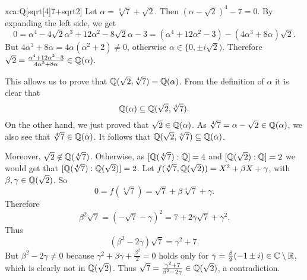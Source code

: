 \begin{sol}{xca:Q[sqrt[4]{7}+sqrt{2}]}
Let $\alpha=\sqrt[4]{7}+\sqrt{2}$. Then $(\alpha - \sqrt{2})^4 -7 = 0$.
By expanding the left side, we get
\[
0  =\alpha^4 - 4\sqrt{2}\alpha^3 + 12 \alpha^2 - 8\sqrt{2}\alpha - 3 
 = (\alpha^4 + 12\alpha^2 - 3) -  (4 \alpha^3 + 8 \alpha )\sqrt{2}.
\]
But $4 \alpha^3 + 8 \alpha = 4\alpha (\alpha^2+2) \neq 0$, otherwise $\alpha\in\{0,\pm i\sqrt{2})$.
Therefore $\sqrt{2}=\frac{\alpha^4 + 12\alpha^2 - 3}{4 \alpha^3 + 8 \alpha}\in \mathbb{Q}(\alpha) $.

This allows us to prove that $\mathbb{Q}(\sqrt{2} , \sqrt[4]{7}) = \mathbb{Q}(\alpha)$.
From the definition of $\alpha$ it is clear that 
\[
\mathbb{Q}(\alpha) \subseteq \mathbb{Q}(\sqrt{2} , \sqrt[4]{7}).
\]
On the other hand, we just proved that $\sqrt{2} \in \mathbb{Q}(\alpha)$.
As $\sqrt[4]{7} = \alpha - \sqrt{2} \in \mathbb{Q}(\alpha)$,
we also see that $\sqrt[4]{7} \in \mathbb{Q}(\alpha)$.
It follows that $\mathbb{Q}(\sqrt{2} , \sqrt[4]{7}) \subseteq \mathbb{Q}(\alpha)$.

Moreover, $\sqrt{2}\not\in \mathbb{Q}(\sqrt[4]{7})$. 
Otherwise, as $[\mathbb{Q}(\sqrt[4]{7}):\mathbb{Q}] = 4$ and $[\mathbb{Q}(\sqrt{2}):\mathbb{Q}] = 2$
we would get that $[\mathbb{Q}(\sqrt[4]{7}):\mathbb{Q}(\sqrt{2})] = 2$.
Let $f(\sqrt[4]{7},\mathbb{Q}(\sqrt{2})) = X^2 + \beta X + \gamma$,
with $\beta, \gamma \in \mathbb{Q}(\sqrt{2})$. 
So 
$$0=f(\sqrt[4]{7})=\sqrt{7} + \beta \sqrt[4]{7} + \gamma.$$
Therefore 
$$\beta^2 \sqrt{7}  = (- \sqrt{7} - \gamma)^2 =7 + 2\gamma \sqrt{7}  + \gamma^2.$$
Thus 
\[
(\beta^2 - 2 \gamma)\sqrt{7}= \gamma^2 + 7.
\]
But $\beta^2 - 2 \gamma\neq 0$ because 
$\gamma^2 + \beta \gamma + \frac{\beta^2}{2} = 0$ 
holds only for $\gamma =\frac{\beta}{2} (-1 \pm i)\in \mathbb{C}\setminus\mathbb{R}$,
which is clearly not in $\mathbb{Q}(\sqrt{2})$.
Thus 
$\sqrt{7} = \frac{\gamma^2 + 7}{\beta^2 - 2 \gamma} \in \mathbb{Q}(\sqrt{2})$, a contradiction.


\end{sol}
